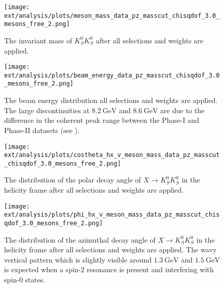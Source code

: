 \begin{figure}
  \begin{center}
    \texttt{[image: ext/analysis/plots/meson\_mass\_data\_pz\_masscut\_chisqdof\_3.0\_mesons\_free\_2.png]}
  \end{center}
  \caption{The invariant mass of $K_S^0K_S^0$ after all selections and weights are applied.}\label{fig:meson-mass-data-pz-masscut-chisqdof-3.0-mesons-free-2}
\end{figure}
\begin{figure}
  \begin{center}
    \texttt{[image: ext/analysis/plots/beam\_energy\_data\_pz\_masscut\_chisqdof\_3.0\_mesons\_free\_2.png]}
  \end{center}
  \caption{The beam energy distribution all selections and weights are applied. The large discontinuities at $\SI{8.2}{\giga\electronvolt}$ and $\SI{8.6}{\giga\electronvolt}$ are due to the difference in the coherent peak range between the Phase-I and Phase-II datasets (see ).}\label{fig:beam-energy-data-pz-masscut-chisqdof-3.0-mesons-free-2}
\end{figure}
\begin{figure}
  \begin{center}
    \texttt{[image: ext/analysis/plots/costheta\_hx\_v\_meson\_mass\_data\_pz\_masscut\_chisqdof\_3.0\_mesons\_free\_2.png]}
  \end{center}
  \caption{The distribution of the polar decay angle of $X \to K_S^0K_S^0$ in the helicity frame after all selections and weights are applied.}\label{fig:costheta-hx-v-meson-mass-data-pz-masscut-chisqdof-3.0-mesons-free-2}
\end{figure}
\begin{figure}
  \begin{center}
    \texttt{[image: ext/analysis/plots/phi\_hx\_v\_meson\_mass\_data\_pz\_masscut\_chisqdof\_3.0\_mesons\_free\_2.png]}
  \end{center}
  \caption{The distribution of the azimuthal decay angle of $X \to K_S^0K_S^0$ in the helicity frame after all selections and weights are applied. The wavy vertical pattern which is slightly visible around $\SI{1.3}{\giga\electronvolt}$ and $\SI{1.5}{\giga\electronvolt}$ is expected when a spin-$2$ resonance is present and interfering with spin-$0$ states.}\label{fig:phi-hx-v-meson-mass-data-pz-masscut-chisqdof-3.0-mesons-free-2}
\end{figure}
